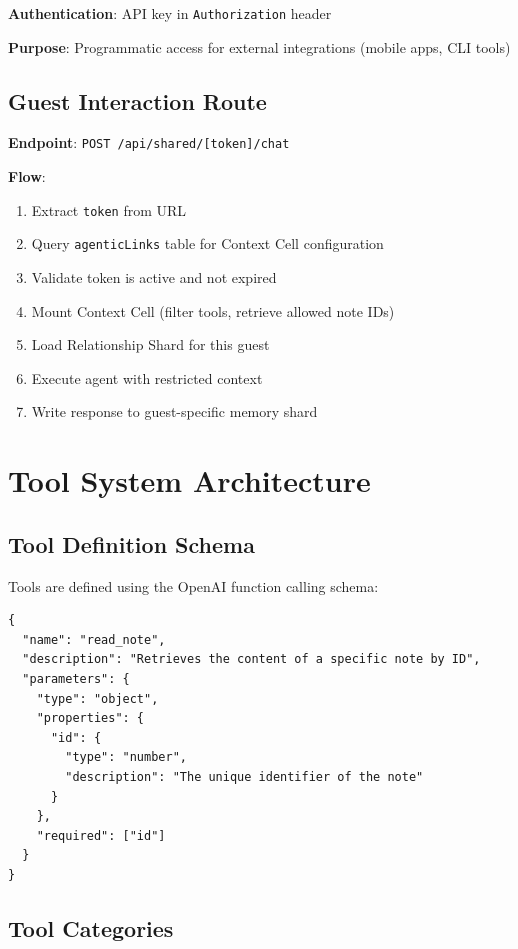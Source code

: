 \textbf{Authentication}: API key in \texttt{Authorization} header

\textbf{Purpose}: Programmatic access for external integrations (mobile apps, CLI tools)

\subsection{Guest Interaction Route}

\textbf{Endpoint}: \texttt{POST /api/shared/[token]/chat}

\textbf{Flow}:
\begin{enumerate}
    \item Extract \texttt{token} from URL
    \item Query \texttt{agenticLinks} table for Context Cell configuration
    \item Validate token is active and not expired
    \item Mount Context Cell (filter tools, retrieve allowed note IDs)
    \item Load Relationship Shard for this guest
    \item Execute agent with restricted context
    \item Write response to guest-specific memory shard
\end{enumerate}

\section{Tool System Architecture}

\subsection{Tool Definition Schema}

Tools are defined using the OpenAI function calling schema:

\begin{verbatim}
{
  "name": "read_note",
  "description": "Retrieves the content of a specific note by ID",
  "parameters": {
    "type": "object",
    "properties": {
      "id": {
        "type": "number",
        "description": "The unique identifier of the note"
      }
    },
    "required": ["id"]
  }
}
\end{verbatim}

\subsection{Tool Categories}

